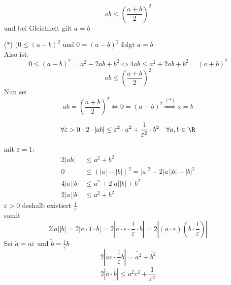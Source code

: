 \documentclass[12pt,a4paper,titlepage,draft]{article}
\begin{document}
	\begin{kor}
		\[ab \leq \left(\frac{a+b}{2}\right)^2\]
		und bei Gleichheit gilt \(a = b\)
	\end{kor}
	\begin{bew}
		(\(\ast\)) \((0 \leq (a-b)^2\) und \(0 = (a-b)^2\) folgt \(a = b\)\\
		Also ist:
		\[0 \leq (a-b)^2 = a^2 - 2ab + b^2 \Leftrightarrow 4ab \leq a^2 +2ab + b^2 = (a+b)^2\]
		\[ab \leq \left(\frac{a+b}{2}\right)^2\]
		Nun sei
		\[ab = \left(\frac{a+b}{2}\right)^2 \Leftrightarrow 0 = (a-b)^2 \overset{(\ast)}{\Rightarrow} a = b\]
	\end{bew}
	\begin{satz}
		\[\forall \varepsilon > 0: 2 \cdot |ab| \leq \varepsilon^2 \cdot a^2 + \frac{1}{\varepsilon^2} \cdot b^2 \quad \forall a,b \in \R\]
	\end{satz}
	\begin{bew}
		mit \(\varepsilon = 1\):\\
		\begin{align*}
			2|ab| &\leq a^2 + b^2\\
			0 &\leq (|a| - |b|)^2 = |a|^2 - 2|a||b| + |b|^2\\
			4|a||b| &\leq a^2 + 2|a||b| + b^2\\
			2|a||b| &\leq a^2 + b^2
		\end{align*}
		\(\varepsilon > 0\) deshalb existiert \(\frac{1}{\varepsilon}\)\\
		somit 
		\[2|a||b| = 2|a \cdot 1 \cdot b| = 2|a \cdot \varepsilon \cdot \frac{1}{\varepsilon} \cdot b| = 2|(a \cdot \varepsilon)(b \cdot \frac{1}{\varepsilon})|\]
		Sei \(\tilde{a} = a\varepsilon\) und \(\tilde{b} = \frac{1}{\varepsilon}b\)
		\[2\left|a\varepsilon \cdot \frac{1}{\varepsilon}b\right| = \tilde{a^2} + \tilde{b^2}\]
		\[2|\tilde{a} \cdot \tilde{b}| \leq a^2\varepsilon^2 + \frac{1}{\varepsilon^2}\] 
	\end{bew}
\end{document}

